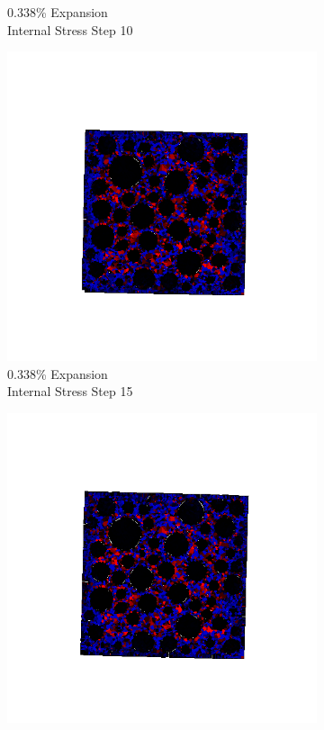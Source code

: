\begin{figure}[ht!]
\begin{subfigure}{.25\textwidth}
      \caption{0.338\% Expansion\\Internal Stress Step 10}
    \end{subfigure}%
    \begin{subfigure}{.25\textwidth}
      \centering
      \includegraphics[width=1.0\linewidth]{Files/exp_3D/DEF/A30X-5C_2_s15.png}
      \caption{0.338\% Expansion\\Internal Stress Step 15}
    \end{subfigure}%
    \begin{subfigure}{.25\textwidth}
      \centering
      \includegraphics[width=1.0\linewidth]{Files/exp_3D/DEF/A30X-5C_2_stress.png}

\end{subfigure}
\end{figure}

